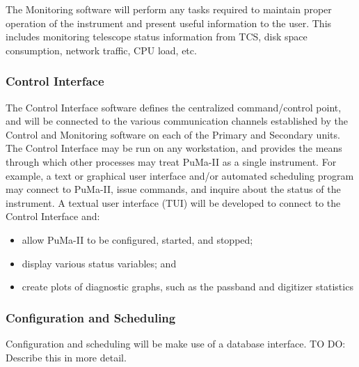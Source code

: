 The Monitoring software will perform any tasks required to maintain
proper operation of the instrument and present useful information to
the user.  This includes monitoring telescope status information from
TCS, disk space consumption, network traffic, CPU load, etc.

\subsubsection{Control Interface}

The Control Interface software defines the centralized command/control
point, and will be connected to the various communication channels
established by the Control and Monitoring software on each of the
Primary and Secondary units.  The Control Interface may be run on any
workstation, and provides the means through which other processes may
treat PuMa-II as a single instrument.  For example, a text or
graphical user interface and/or automated scheduling program may
connect to PuMa-II, issue commands, and inquire about the status of
the instrument.  A textual user interface (TUI) will be developed to
connect to the Control Interface and:
\begin{itemize}
\item allow PuMa-II to be configured, started, and stopped;
\vspace{-2mm}
\item display various status variables; and
\vspace{-2mm}
\item create plots of diagnostic graphs, 
      such as the passband and digitizer statistics
\end{itemize}

\subsubsection{Configuration and Scheduling}

Configuration and scheduling will be make use of a database interface.
TO DO: Describe this in more detail.
